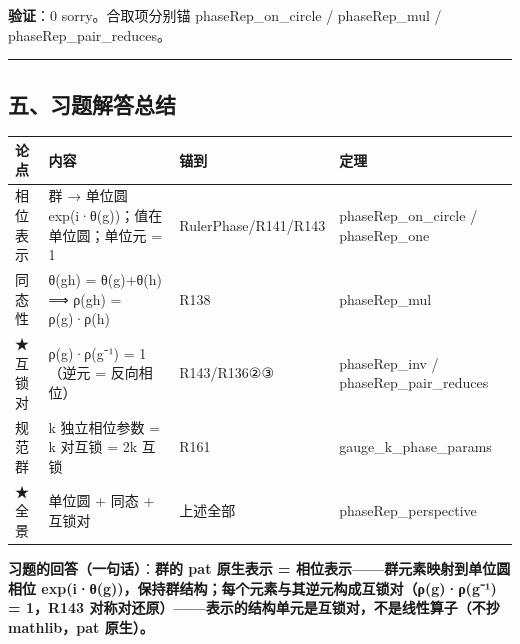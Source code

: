 \documentclass[
]{article}
\newcounter{none} %
\begin{document}
\textbf{验证}：0 sorry。合取项分别锚 phaseRep\_on\_circle /
phaseRep\_mul / phaseRep\_pair\_reduces。

\begin{center}\rule{0.5\linewidth}{0.5pt}\end{center}

\subsection{五、习题解答总结}\label{ux4e94ux4e60ux9898ux89e3ux7b54ux603bux7ed3}

{\def\LTcaptype{none} %
\begin{longtable}[]{@{}
 >{\raggedright\arraybackslash}p{}
 >{\raggedright\arraybackslash}p{}
 >{\raggedright\arraybackslash}p{}
 >{\raggedright\arraybackslash}p{}@{}}
\toprule\noalign{}
\begin{minipage}[b]{\linewidth}\raggedright
论点
\end{minipage} & \begin{minipage}[b]{\linewidth}\raggedright
内容
\end{minipage} & \begin{minipage}[b]{\linewidth}\raggedright
锚到
\end{minipage} & \begin{minipage}[b]{\linewidth}\raggedright
定理
\end{minipage} \\
\midrule\noalign{}
\endhead
\bottomrule\noalign{}
\endlastfoot
相位表示 & 群 → 单位圆 exp(i·θ(g))；值在单位圆；单位元 = 1 &
RulerPhase/R141/R143 & phaseRep\_on\_circle / phaseRep\_one \\
同态性 & θ(gh) = θ(g)+θ(h) ⟹ ρ(gh) = ρ(g)·ρ(h) & R138 & phaseRep\_mul \\
★互锁对 & ρ(g)·ρ(g⁻¹) = 1（逆元 = 反向相位） & R143/R136②③ &
phaseRep\_inv / phaseRep\_pair\_reduces \\
规范群 & k 独立相位参数 = k 对互锁 = 2k 互锁 & R161 &
gauge\_k\_phase\_params \\
★全景 & 单位圆 + 同态 + 互锁对 & 上述全部 & phaseRep\_perspective \\
\end{longtable}
}

\textbf{习题的回答（一句话）}：\textbf{群的 pat 原生表示 =
相位表示------群元素映射到单位圆相位
exp(i·θ(g))，保持群结构；每个元素与其逆元构成互锁对（ρ(g)·ρ(g⁻¹) =
1，R143 对称对还原）------表示的结构单元是互锁对，不是线性算子（不抄
mathlib，pat 原生）。}
\end{document}
